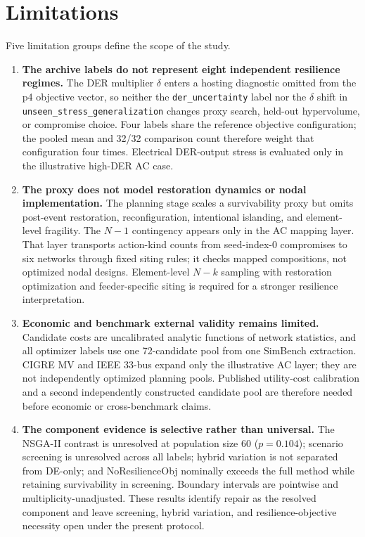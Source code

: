 \documentclass[energies,article,submit,moreauthors]{Definitions/mdpi}
\begin{document}
\section{Limitations}\label{limitations}

Five limitation groups define the scope of the study.

\begin{enumerate}
\def\labelenumi{\arabic{enumi}.}
\item
  \textbf{The archive labels do not represent eight independent resilience regimes.} The DER multiplier \(\delta\) enters a hosting diagnostic omitted from the p4 objective vector, so neither the \texttt{der\_uncertainty} label nor the \(\delta\) shift in \texttt{unseen\_stress\_generalization} changes proxy search, held-out hypervolume, or compromise choice. Four labels share the reference objective configuration; the pooled mean and 32/32 comparison count therefore weight that configuration four times. Electrical DER-output stress is evaluated only in the illustrative high-DER AC case.
\item
  \textbf{The proxy does not model restoration dynamics or nodal implementation.} The planning stage scales a survivability proxy but omits post-event restoration, reconfiguration, intentional islanding, and element-level fragility. The \(N-1\) contingency appears only in the AC mapping layer. That layer transports action-kind counts from seed-index-0 compromises to six networks through fixed siting rules; it checks mapped compositions, not optimized nodal designs. Element-level \(N-k\) sampling with restoration optimization and feeder-specific siting is required for a stronger resilience interpretation.
\item
  \textbf{Economic and benchmark external validity remains limited.} Candidate costs are uncalibrated analytic functions of network statistics, and all optimizer labels use one 72-candidate pool from one SimBench extraction. CIGRE MV and IEEE 33-bus expand only the illustrative AC layer; they are not independently optimized planning pools. Published utility-cost calibration and a second independently constructed candidate pool are therefore needed before economic or cross-benchmark claims.
\item
  \textbf{The component evidence is selective rather than universal.} The NSGA-II contrast is unresolved at population size 60 (\(p=0.104\)); scenario screening is unresolved across all labels; hybrid variation is not separated from DE-only; and NoResilienceObj nominally exceeds the full method while retaining survivability in screening. Boundary intervals are pointwise and multiplicity-unadjusted. These results identify repair as the resolved component and leave screening, hybrid variation, and resilience-objective necessity open under the present protocol.

\end{enumerate}
\end{document}
